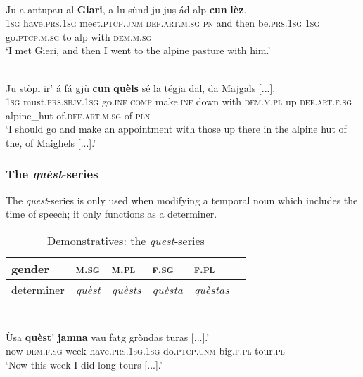 \ea
\label{demtop5}
\\
\gll Ju a antupau al \textbf{Giari}, a lu sùnd ju juṣ ád alp \textbf{cun} \textbf{lèz}.\\
\textsc{1sg} have.\textsc{prs.1sg} meet.\textsc{ptcp.unm} \textsc{def.art.m.sg} \textsc{pn} and then be.\textsc{prs.1sg} \textsc{1sg} go.\textsc{ptcp.m.sg} to alp with \textsc{dem.m.sg}  \\
\glt `I met Gieri, and then I went to the alpine pasture with him.'
\z

\ea\label{demtop3}
\\
\gll Ju stòpi ir' á fá gjù \textbf{cun} \textbf{quèls} sé la tégja dal, da Majgals [...].\\
\textsc{1sg} must.\textsc{prs.sbjv.1sg} go.\textsc{inf} \textsc{comp} make.\textsc{inf} down with \textsc{dem.m.pl} up \textsc{def.art.f.sg} alpine\_hut of.\textsc{def.art.m.sg} of \textsc{pln}\\
\glt `I should go and make an appointment with those up there in the alpine hut of the, of Maighels [...].'
\z

\subsubsection{The \textit{quèst}-series}
The \textit{quest}-series is only used when modifying a temporal noun which includes the time of speech; it only functions as a determiner.

\begin{table}
\caption{Demonstratives: the \textit{quest}-series}
\label{demquest}
 \begin{tabular}{llllll}
  \lsptoprule
      gender      & \textsc{m.sg} & \textsc{m.pl} & \textsc{f.sg} & \textsc{f.pl}\\
  \midrule
  determiner  & \textit{quèst} &  \textit{quèsts}  & \textit{quèsta}  & \textit{quèstas}\\
  
  \lspbottomrule
 \end{tabular}
\end{table}

\ea\label{ex:questjamna}
\\
\gll Ùsa \textbf{quèst}' \textbf{jamna} vau fatg gròndas turas [...].'\\
now \textsc{dem.f.sg} week have.\textsc{prs.1sg.1sg} do.\textsc{ptcp.unm} big.\textsc{f.pl} tour.\textsc{pl}\\
\glt `Now this week I did long tours [...].'
\z

